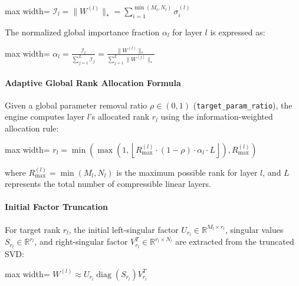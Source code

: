 \begin{center}
\begin{adjustbox}{max width=\columnwidth}
$\displaystyle
\mathcal{I}_l = \|W^{(l)}\|_* = \sum_{i=1}^{\min(M_l, N_l)} \sigma_i^{(l)}
$
\end{adjustbox}
\end{center}

The normalized global importance fraction $\alpha_l$ for layer $l$ is expressed as:

\begin{center}
\begin{adjustbox}{max width=\columnwidth}
$\displaystyle
\alpha_l = \frac{\mathcal{I}_l}{\sum_{j=1}^{L} \mathcal{I}_j} = \frac{\|W^{(l)}\|_*}{\sum_{j=1}^{L} \|W^{(j)}\|_*}
$
\end{adjustbox}
\end{center}

\paragraph{Adaptive Global Rank Allocation Formula}
Given a global parameter removal ratio $\rho \in (0, 1)$ (\texttt{target\_param\_ratio}), the engine computes layer $l$'s allocated rank $r_l$ using the information-weighted allocation rule:

\begin{center}
\begin{adjustbox}{max width=\columnwidth}
$\displaystyle
r_l = \min\left( \max\left( 1, \left\lfloor R_{\max}^{(l)} \cdot (1 - \rho) \cdot \alpha_l \cdot L \right\rfloor \right), R_{\max}^{(l)} \right)
$
\end{adjustbox}
\end{center}

where $R_{\max}^{(l)} = \min(M_l, N_l)$ is the maximum possible rank for layer $l$, and $L$ represents the total number of compressible linear layers.

\paragraph{Initial Factor Truncation}
For target rank $r_l$, the initial left-singular factor $U_{r_l} \in \mathbb{R}^{M_l \times r_l}$, singular values $S_{r_l} \in \mathbb{R}^{r_l}$, and right-singular factor $V_{r_l}^T \in \mathbb{R}^{r_l \times N_l}$ are extracted from the truncated SVD:

\begin{center}
\begin{adjustbox}{max width=\columnwidth}
$\displaystyle
W^{(l)} \approx U_{r_l} \operatorname{diag}(S_{r_l}) V_{r_l}^T
$
\end{adjustbox}
\end{center}

